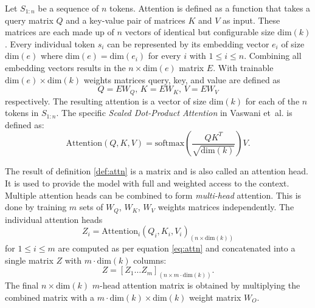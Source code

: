     \begin{definition}
    \label{def:attn}
        Let $S_{1:n}$ be a sequence of $n$ tokens.
        Attention is defined as a function that takes a query matrix $Q$ and a key-value pair of matrices $K$ and $V$ as input.
        These matrices are each made up of $n$ vectors of identical but configurable size $\mathrm{dim}(k)$.
        Every individual token $s_i$ can be represented by its embedding vector $e_i$ of size $\mathrm{dim}(e)$ where $\mathrm{dim}(e) = \mathrm{dim}(e_i)$ for every $i$ with $1 \leq i \leq n$.
        Combining all embedding vectors results in the $n \times \mathrm{dim}(e)$ matrix $E$.
        With trainable $\mathrm{dim}(e) \times \mathrm{dim}(k)$ weights matrices query, key, and value are defined as
        \begin{equation}
            Q = E W_Q \text{, } K = E W_K \text{, } V = E W_V
        \end{equation}
        respectively.
        The resulting attention is a vector of size $\mathrm{dim}(k)$ for each of the $n$ tokens in $S_{1:n}$.
        The specific \emph{Scaled Dot-Product Attention} in Vaswani et~al. \cite{vaswani2023attention} is defined as:
        \begin{equation}
        \label{eq:attn}
            \mathrm{Attention}(Q,K,V) = \mathrm{softmax}\left( \frac{QK^T}{\sqrt{\mathrm{dim}(k)}} \right)V \text{.}
        \end{equation}
    \end{definition}

    The result of definition \ref{def:attn} is a matrix and is also called an attention head.
    It is used to provide the model with full and weighted access to the context.
    Multiple attention heads can be combined to form \emph{multi-head} attention.
    This is done by training $m$ sets of $W_Q$, $W_K$, $W_V$ weights matrices independently.
    The individual attention heads
    \begin{equation}
        Z_i = \mathrm{Attention}_i(Q_i,K_i,V_i)_{(n \times \mathrm{dim}(k))}
    \end{equation}
    for $1 \leq i \leq m$ are computed as per equation \ref{eq:attn} and concatenated into a single matrix $Z$ with $m \cdot \mathrm{dim}(k)$ columns:
    \begin{equation}
        Z = \left[ Z_1 \dots Z_m \right]_{(n \times m \cdot \mathrm{dim}(k))} \text{.}
    \end{equation}
    The final $n \times \mathrm{dim}(k)$ $m$-head attention matrix is obtained by multiplying the combined matrix with a $m \cdot \mathrm{dim}(k) \times \mathrm{dim}(k)$ weight matrix $W_O$.
    
